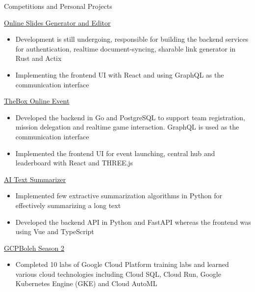 \documentclass{article}
\newlength{\tabin}
\newlength{\secsep}
\newcommand{\lineunder}{\vspace*{-8pt} \\ \hspace*{-6pt} \hrulefill \\ \vspace*{-15pt}}
\newenvironment{tabbedsection}[1]{
  \begin{list}{}{
      \setlength{\itemsep}{0pt}
      \setlength{\labelsep}{0pt}
      \setlength{\labelwidth}{0pt}
      \setlength{\leftmargin}{\tabin}
      \setlength{\rightmargin}{\tabin}
      \setlength{\listparindent}{0pt}
      \setlength{\parsep}{0pt}
      \setlength{\parskip}{0pt}
      \setlength{\partopsep}{0pt}
      \setlength{\topsep}{#1}
    }
  \item[]
}{\end{list}}
\newenvironment{resume_section}[1]{
  \filbreak
  \vspace{2\secsep}
  \textsc{\large#1}
  \lineunder
  \begin{tabbedsection}{\secsep}
}{\end{tabbedsection}}
\newenvironment{resume_subsection}[2][]{
  \textbf{#2} \hfill {\footnotesize #1} \hspace{2em}
  \begin{tabbedsection}{0.5\secsep}
}{\end{tabbedsection}}
\newenvironment{subitems}{
  \renewcommand{\labelitemi}{-}
  \begin{itemize}
      \setlength{\labelsep}{1em}
}{\end{itemize}}
\begin{document}
\begin{resume_section}{Competitions and Personal Projects}
  \begin{resume_subsection}{\href{https://github.com/marcustut/fyp}{Online Slides Generator and Editor}}
  \begin{subitems}
    \item Development is still undergoing, responsible for building the backend services for authentication, realtime document-syncing, sharable link generator in Rust and Actix
    \item Implementing the frontend UI with React and using GraphQL as the communication interface
    \end{subitems}
  \end{resume_subsection}


  \begin{resume_subsection}{\href{https://github.com/marcustut/thebox}{TheBox Online Event}}
  \begin{subitems}
    \item Developed the backend in Go and PostgreSQL to support team registration, mission delegation and realtime game interaction. GraphQL is used as the communication interface
    \item Implemented the frontend UI for event launching, central hub and leaderboard with React and THREE.js
    \end{subitems}
  \end{resume_subsection}

  \begin{resume_subsection}{\href{https://github.com/marcustut/summarize}{AI Text Summarizer}}
  \begin{subitems}
    \item Implemented few extractive summarization algorithms in Python for effectively summarizing a long text
    \item Developed the backend API in Python and FastAPI whereas the frontend was using Vue and TypeScript
    \end{subitems}
  \end{resume_subsection}

  \begin{resume_subsection}{\href{https://www.qwiklabs.com/public_profiles/d668c6be-b102-411f-8c49-512de455899f}{GCPBoleh Season 2}}
  \begin{subitems}
    \item Completed 10 labs of Google Cloud Platform training labs and learned various cloud technologies including Cloud SQL, Cloud Run, Google Kubernetes Engine (GKE) and Cloud AutoML
    \end{subitems}
  \end{resume_subsection}


\end{resume_section}
\end{document}
